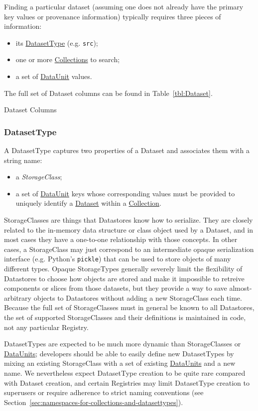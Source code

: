 \documentclass[DM,toc]{lsstdoc}
\newcommand{\tblref}[1]{\hyperref[tbl:#1]{#1}}
\newcommand{\coltable}[1]{
    \begin{table}[!htb]
        {\footnotesize
        }
        \caption{#1 Columns}
        \label{tbl:#1}
    \end{table}
}
\begin{document}
Finding a particular dataset (assuming one does not already have the primary key values or provenance information) typically requires three pieces of information:
\begin{itemize}
    \item its \hyperref[sec:DatasetType]{DatasetType} (e.g. \texttt{src});
    \item one or more \hyperref[sec:collections]{Collections} to search;
    \item a set of \hyperref[sec:dataunits]{DataUnit} values.
\end{itemize}

The full set of Dataset columns can be found in Table~\ref{tbl:Dataset}.

\coltable{Dataset}


\subsubsection{DatasetType}
\label{sec:DatasetType}

A DatasetType captures two properties of a Dataset and associates them with a string name:
\begin{itemize}
    \item a \emph{StorageClass};
    \item a set of \hyperref[sec:dataunits]{DataUnit} keys whose corresponding values must be provided to uniquely identify a \tblref{Dataset} within a \hyperref[sec:collections]{Collection}.
\end{itemize}

StorageClasses are things that Datastores know how to serialize.
They are closely related to the in-memory data structure or class object used by a Dataset, and in most cases they have a one-to-one relationship with those concepts.
In other cases, a StorageClass may just correspond to an intermediate opaque serialization interface (e.g. Python's \texttt{pickle}) that can be used to store objects of many different types.
Opaque StorageTypes generally severely limit the flexibility of Datastores to choose how objects are stored and make it impossible to retreive components or slices from those datasets, but they provide a way to save almost-arbitrary objects to Datastores without adding a new StorageClass each time.
Because the full set of StorageClasses must in general be known to all Datastores, the set of supported StorageClasses and their definitions is maintained in code, not any particular Registry.

DatasetTypes are expected to be much more dynamic than StorageClasses or \hyperref[sec:dataunits]{DataUnits}; developers should be able to easily define new DatasetTypes by mixing an existing StorageClass with a set of existing \hyperref[sec:dataunits]{DataUnits} and a new name.
We nevertheless expect DatasetType creation to be quite rare compared with Dataset creation, and certain Registries may limit DatasetType creation to superusers or require adherence to strict naming conventions (see Section~\ref{sec:namespaces-for-collections-and-datasettypes}).
\end{document}

